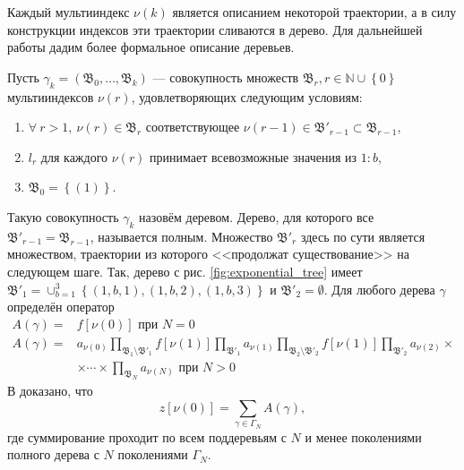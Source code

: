 Каждый мультииндекс $\nu(k)$ является описанием некоторой траектории, а в силу конструкции индексов эти траектории сливаются в дерево. Для дальнейшей работы дадим более формальное описание деревьев.

Пусть $\gamma_k = \left(\mathfrak{B}_0,\ldots,\mathfrak{B}_k\right)$ --- совокупность множеств $\mathfrak{B}_r, r\in \mathbb{N}\cup\left\lbrace 0\right\rbrace$ мультииндексов $\nu(r)$, удовлетворяющих следующим условиям:
\begin{enumerate}
	\item $\forall\: r > 1, \:\nu(r)\in \mathfrak{B}_r$ соответствующее $\nu(r-1)\in\mathfrak{B}'_{r-1}\subset\mathfrak{B}_{r-1}$,
	\item $l_r$ для каждого $\nu(r)$ принимает всевозможные значения из $1:b$,
	\item $\mathfrak{B}_0 = \left\lbrace\left(1\right)\right\rbrace$.
\end{enumerate}
Такую совокупность $\gamma_k$ назовём деревом. Дерево, для которого все $\mathfrak{B}'_{r-1} = \mathfrak{B}_{r-1}$, называется полным. Множество $\mathfrak{B}'_{r}$ здесь по сути является множеством, траектории из которого <<продолжат существование>> на следующем шаге. Так, дерево с рис. \ref{fig:exponential_tree} имеет $\mathfrak{B}'_1 = \cup_{b=1}^3 \left\lbrace (1, b,1), (1,b,2), (1,b,3)\right\rbrace$ и $\mathfrak{B}'_2 = \emptyset$. Для любого дерева $\gamma$ определён оператор
$$
	\begin{aligned}
	A\left(\gamma\right) = &f\left[\nu(0)\right] \text{ при } N=0 \\
	A\left(\gamma\right) = &a_{\nu(0)}\prod_{\mathfrak{B}_1\setminus\mathfrak{B}'_1}f\left[\nu(1)\right]\prod_{\mathfrak{B}'_1}a_{\nu(1)} \prod_{\mathfrak{B}_2\setminus\mathfrak{B}'_2}f\left[\nu(1)\right]\prod_{\mathfrak{B}'_2}a_{\nu(2)} \times \\
	&\times\cdots\times \prod_{\mathfrak{B}_N}a_{\nu(N)} \text{ при } N>0
	\end{aligned} 
$$
В \cite{montekarlo1975} доказано, что 
\begin{equation}\label{eq:subtrees}
z\left[\nu(0)\right] = \sum_{\gamma\in\Gamma_N}A\left(\gamma\right),
\end{equation}
где суммирование проходит по всем поддеревьям с $N$ и менее поколениями полного дерева с $N$ поколениями $\Gamma_N$.

